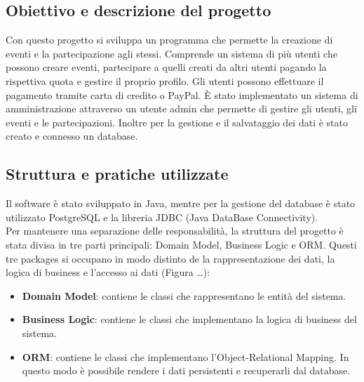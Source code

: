 \documentclass[11pt]{article}
\begin{document}
        \subsection{Obiettivo e descrizione del progetto} \label{subsec:obiettivi-e-descrizione-del-progetto}

            Con questo progetto si sviluppa un programma che permette la creazione di eventi e la partecipazione agli stessi.
            Comprende un sistema di più utenti che possono creare eventi, partecipare a quelli creati da altri utenti pagando la rispettiva quota e gestire il proprio profilo.
            Gli utenti possono effettuare il pagamento tramite carta di credito o PayPal.
            È stato implementato un sistema di amministrazione attraverso un utente admin che permette di gestire gli utenti, gli eventi e le partecipazioni.
            Inoltre per la gestione e il salvataggio dei dati è stato creato e connesso un database.

        \subsection{Struttura e pratiche utilizzate} \label{subsec:struttura-e-pratiche-utilizzate}

            Il software è stato sviluppato in Java, mentre per la gestione del database è stato utilizzato PostgreSQL e
            la libreria JDBC (Java DataBase Connectivity). \\ %

            Per mantenere una separazione delle responsabilità, la struttura del progetto è stata divisa in tre parti principali: Domain Model, Business Logic e ORM.
            Questi tre packages si occupano in modo distinto de la rappresentazione dei dati, la logica di business e l'accesso ai dati (Figura \ldots): %
            \begin{itemize}
                \item \textbf{Domain Model}: contiene le classi che rappresentano le entità del sistema.
                \item \textbf{Business Logic}: contiene le classi che implementano la logica di business del sistema.
                \item \textbf{ORM}: contiene le classi che implementano l'Object-Relational Mapping. In questo modo è possibile rendere
                                    i dati persistenti e recuperarli dal database.
            \end{itemize}
\end{document}
